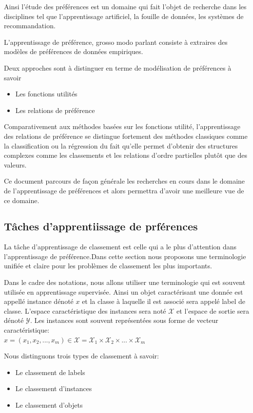 \documentclass[a4paper,12pt,openany,oneside]{article}
\begin{document}
Ainsi l'étude des préférences est un domaine qui fait l'objet de recherche dans les disciplines tel que l'apprentissage artificiel, la fouille de données, les systèmes de recommandation.

L'apprentissage de préférence, grosso modo parlant consiste à extraires des modèles de préférences de données empiriques.

Deux approches sont à distinguer en terme de modélisation de préférences à savoir
\begin{itemize}
	\item Les fonctions utilités
	\item Les relations de préférence
\end{itemize}

Comparativement aux méthodes basées sur les fonctions utilité, l'apprentissage des relations de préférence se distingue fortement des méthodes classiques comme la classification ou la régression du fait qu'elle permet d'obtenir des structures complexes comme les classements et les relations d'ordre partielles plutôt que des valeurs.

Ce document parcours de façon générale les recherches en cours dans le domaine de l'apprentissage de préférences et alors permettra d'avoir une meilleure vue de ce domaine.

\subsection{Tâches d'apprentiissage de prférences}
La tâche d'apprentissage de classement est celle qui a le plus d'attention dans l'apprentissage de préférence.Dans cette section nous proposons une terminologie unifiée et claire pour les problèmes de classement les plus importants.

Dans le cadre des notations, nous allons utiliser une terminologie qui est souvent utilisée en apprentissage supervisée. Ainsi un objet caractérisant une donnée est appellé instance dénoté $x$ et la classe à laquelle il est associé sera appelé label de classe. L'espace caractéristique des instances sera noté $\mathcal{X}$ et l'espace de sortie sera dénoté $\mathcal{Y}$.
Les instances sont souvent représentées sous forme de vecteur caractéristique:\\
$x=(x_1,x_2,...,x_m)\in \mathcal{X}=\mathcal{X}_1\times \mathcal{X}_2\times ... \times \mathcal{X}_m$

Nous distinguons trois types de classement à savoir:
\begin{itemize}
	\item Le classement de labels
	\item Le classement d'instances
	\item Le classement d'objets
\end{itemize}
\end{document}
